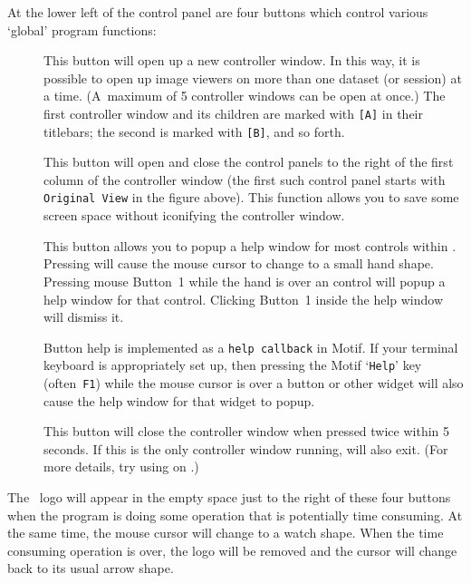 At the lower left of the control panel are four buttons which
control various `global' program functions:
\begin{description}
  \item[\blob{}]
    This button will open up a new \afnit controller window.
    In this way, it is possible to open up image viewers
    on more than one dataset (or session) at a time.
    (A~maximum of 5 controller windows can be open at once.)
    The first controller window and its children are
    marked with {\tt [A]} in their titlebars; the second
    is marked with {\tt [B]}, and so forth.

  \item[\blob{}]
    This button will open and close the control panels to the
    right of the first column of the controller window
    (the first such control panel starts with {\tt Original~View}
     in the figure above).
    This function allows you to save some screen space without
    iconifying the controller window.

  \item[\blob{}]
    This button allows you to popup a help window for
    most controls within \afni.  Pressing 
    will cause the mouse cursor to change to a small hand shape.
    Pressing mouse Button~1 while the hand is over an \afnit control
    will popup a help window for that control.  Clicking Button~1 inside the help
    window will dismiss it.

    Button help is implemented as a {\tt help callback} in Motif.  If your terminal
    keyboard is appropriately set up, then pressing the Motif `{\tt Help}' key
    (often~{\tt F1}) while the mouse cursor is over a button or other widget
    will also cause the help window for that widget to popup.

  \item[\blob{}]
    This button will close the controller window when pressed
    twice within 5 seconds.  If this is the
    only controller window running, \afnit will also exit.
    (For more details, try using  on .)
\end{description}
The \MCW\ logo will appear in the empty space just
to the right of these four buttons when the program is doing
some operation that is potentially time consuming.  At the
same time, the mouse cursor will change to a watch shape.
When the time consuming operation is over, the logo will
be removed and the cursor will change back to its usual arrow shape.

